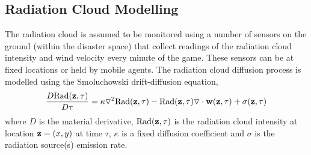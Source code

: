 \subsection{Radiation Cloud Modelling}\label{sec:radiation}
\noindent The radiation cloud is assumed to be monitored using a number of sensors on the ground (within the disaster space) that collect readings of the radiation cloud intensity and wind velocity every minute of the game. These sensors can be at fixed locations or held by mobile agents.  The radiation cloud diffusion process is modelled using the Smoluchowski drift-diffusion equation, 
\begin{eqnarray*}
\frac{D \text{Rad}({\bf z}, \tau)}{D \tau}=\kappa \triangledown^2 \text{Rad}({\bf z},\tau)-\text{Rad}({\bf z},\tau)\triangledown \cdot {\bf w}({\bf z},\tau)+\sigma({\bf z},\tau)
\end{eqnarray*}
where $D$ is the material derivative, $\text{Rad}({\bf z},\tau)$ is the radiation cloud intensity at location ${\bf z}=(x,y)$ at time $\tau$, $\kappa$ is a fixed diffusion coefficient and $\sigma$ is the radiation source(s) emission rate. %


